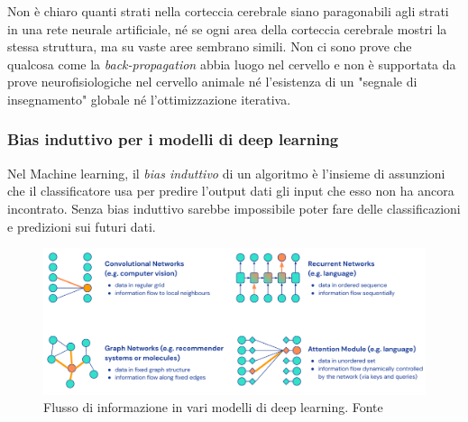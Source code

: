 \par Non è chiaro quanti strati nella corteccia cerebrale siano paragonabili agli strati in una rete neurale artificiale, né se ogni area della corteccia cerebrale mostri la stessa struttura, ma su vaste aree sembrano simili. Non ci sono prove che qualcosa come la \textit{back-propagation} abbia luogo nel cervello e non è supportata da prove neurofisiologiche nel cervello animale né l'esistenza di un "segnale di insegnamento" globale né l'ottimizzazione iterativa.

\subsubsection{Bias induttivo per i modelli di deep learning}

Nel Machine learning, il \textit{bias induttivo} di un algoritmo è l'insieme di assunzioni che il classificatore usa per predire l'output dati gli input che esso non ha ancora incontrato. Senza bias induttivo sarebbe impossibile poter fare delle classificazioni e predizioni sui futuri dati. 

\begin{figure}[!htb]
	\centering
	\includegraphics[scale=0.4]{images/dl-inductive-bias.png}
	\caption{Flusso di informazione in vari modelli di deep learning. Fonte\cite{AFslide}}
	\label{fig:bias-dl}
\end{figure}



\clearpage









